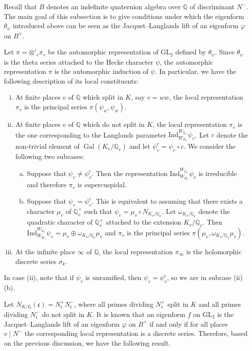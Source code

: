 \documentclass{amsart}
\numberwithin{equation}{section}
\newcommand{\bb}{\mathbb}
\newcommand{\frk}{\mathfrak}
\newcommand{\Gal}{\operatorname{Gal}}
\newcommand{\GL}{\mathrm{GL}}
\newcommand{\Ind}{\mathrm{Ind}}
\begin{document}
Recall that $B$ denotes an indefinite quaternion algebra over $\bb{Q}$ of discriminant $N^-$. The main goal of this subsection is to give conditions under which the eigenform $\theta_\psi$ introduced above can be seen as the Jacquet--Langlands lift of an eigenform $\varphi$ on $B^\times$.

Let $\pi=\otimes'_{v} \pi_v$ be the automorphic representation of $\GL_2$ defined by $\theta_\psi$. Since $\theta_\psi$ is the theta series attached to the Hecke character $\psi$, the automorphic representation $\pi$ is the automorphic induction of $\psi$. In particular, we have the following description of its local constituents:
\begin{enumerate}[(i)]
    \item At finite places $v$ of $\bb{Q}$ which split in $K$, say $v=w\overline{w}$, the local representation $\pi_v$ is the principal series $\pi(\psi_w,\psi_{\overline{w}})$.
    \item At finite places $v$ of $\bb{Q}$ which do not split in $K$, the local representation $\pi_v$ is the one corresponding to the Langlands parameter $\Ind_{W_{K_v}}^{W_{\bb{Q}_v}}\psi_v$. Let $c$ denote the non-trivial element of $\Gal(K_v/\bb{Q}_v)$ and let $\psi_v^c=\psi_v\circ c$. We consider the following two subcases:
    \begin{enumerate}[(a)]
        \item Suppose that $\psi_v\neq \psi_v^c$. Then the representation $\Ind_{W_{K_v}}^{W_{\bb{Q}_v}}\psi_v$ is irreducible and therefore $\pi_v$ is supercuspidal.
        \item Suppose that $\psi_v= \psi_v^c$. This is equivalent to assuming that there exists a character $\mu_v$ of $\bb{Q}_v^\times$ such that $\psi_v=\mu_v\circ N_{K_v/\bb{Q}_v}$. Let $\omega_{K_v/\bb{Q}_v}$ denote the quadratic character of $\bb{Q}_v^\times$ attached to the extension $K_v/\bb{Q}_v$. Then $\Ind_{W_{K_v}}^{W_{\bb{Q}_v}}\psi_v=\mu_v\oplus\omega_{K_v/\bb{Q}_v}\mu_v$ and $\pi_v$ is the principal series $\pi(\mu_v,\omega_{K_v/\bb{Q}_v}\mu_v)$.
    \end{enumerate}
    \item At the infinite place $\infty$ of $\bb{Q}$, the local representation $\pi_\infty$ is the holomorphic discrete series $\sigma_k$. 
\end{enumerate}
In case (ii), note that if $\psi_v$ is unramified, then $\psi_v=\psi_v^c$, so we are in subcase (ii)(b).

Let $N_{K/\bb{Q}}(\frk{c})=N_{\frk{c}}^+N_{\frk{c}}^-$, where all primes dividing $N_{\frk{c}}^+$ split in $K$ and all primes dividing $N_{\frk{c}}^-$ do not split in $K$. It is known that an eigenform $f$ on $\GL_2$ is the Jacquet--Langlands lift of an eigenform $\varphi$ on $B^\times$ if and only if for all places $v\mid N^-$ the corresponding local representation is a discrete series. Therefore, based on the previous discussion, we have the following result.
\end{document}
